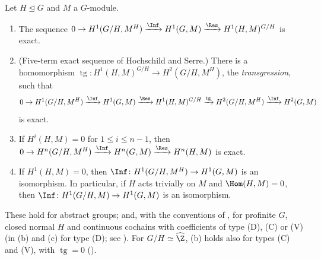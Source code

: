 \begin{theorem}\label{thm:cohomology:inf-res}
Let $H\trianglelefteq G$ and $M$ a $G$-module.
\begin{enumerate}[label=(\alph*)]
\item The sequence $0\to H^1(G/H,M^H)\xrightarrow{\Inf}H^1(G,M)\xrightarrow{\Res}H^1(H,M)^{G/H}$ is exact.
\item \sloppy (Five-term exact sequence of Hochschild and Serre.) There is a homomorphism $\operatorname{tg}\colon H^1(H,M)^{G/H}\to H^2(G/H,M^H)$, the
\emph{transgression}, such that
\[
0\to H^1(G/H,M^H)\xrightarrow{\Inf}H^1(G,M)\xrightarrow{\Res}H^1(H,M)^{G/H}\xrightarrow{\operatorname{tg}}H^2(G/H,M^H)\xrightarrow{\Inf}H^2(G,M)
\]
is exact.
\item If $H^i(H,M)=0$ for $1\le i\le n-1$, then $0\to H^n(G/H,M^H)\xrightarrow{\Inf}H^n(G,M)\xrightarrow{\Res}H^n(H,M)$ is exact.
\item If $H^1(H,M)=0$, then $\Inf\colon H^1(G/H,M^H)\to H^1(G,M)$ is an isomorphism. In particular, if $H$ acts trivially on $M$ and $\Hom(H,M)=0$, then
$\Inf\colon H^1(G/H,M)\to H^1(G,M)$ is an isomorphism.
\end{enumerate}
These hold for abstract groups; and, with the conventions of , for profinite $G$, closed normal $H$ and continuous
cochains with coefficients of type (D), (C) or (V) (in (b) and (c) for type (D); see ). For $G/H\simeq\widehat\Z$, (b) holds
also for types (C) and (V), with $\operatorname{tg}=0$ ().
\end{theorem}

